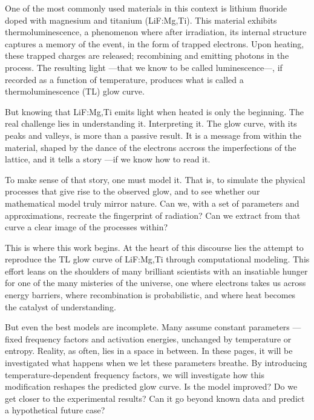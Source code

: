 \vspace{10pt}

One of the most commonly used materials in this context is lithium fluoride doped with magnesium and titanium (LiF:Mg,Ti). This material exhibits thermoluminescence, a phenomenon where after irradiation, its internal structure captures a memory of the event, in the form of trapped electrons. Upon heating, these trapped charges are released; recombining and emitting photons in the process. The resulting light ---that we know to be called luminescence---, if recorded as a function of temperature, produces what is called a thermoluminescence (TL) glow curve. %

But knowing that LiF:Mg,Ti emits light when heated is only the beginning. The real challenge lies in understanding it. Interpreting it. The glow curve, with its peaks and valleys, is more than a passive result. It is a message from within the material, shaped by the dance of the electrons accross the imperfections of the lattice, and it tells a story ---if we know how to read it.

\vspace{10pt}

To make sense of that story, one must model it. That is, to simulate the physical processes that give rise to the observed glow, and to see whether our mathematical model truly mirror nature. Can we, with a set of parameters and approximations, recreate the fingerprint of radiation? Can we extract from that curve a clear image of the processes within?

\vspace{10pt}

This is where this work begins. At the heart of this discourse lies the attempt to reproduce the TL glow curve of LiF:Mg,Ti through computational modeling. This effort leans on the shoulders of many brilliant scientists with an insatiable hunger for one of the many misteries of the universe, one where electrons takes us across energy barriers, where recombination is probabilistic, and where heat becomes the catalyst of understanding.

\vspace{10pt}

But even the best models are incomplete. Many assume constant parameters ---fixed frequency factors and activation energies, unchanged by temperature or entropy. Reality, as often, lies in a space in between. In these pages, it will be investigated what happens when we let these parameters breathe. By introducing temperature-dependent frequency factors, we will investigate how this modification reshapes the predicted glow curve. Is the model improved? Do we get closer to the experimental results? Can it go beyond known data and predict a hypothetical future case?


